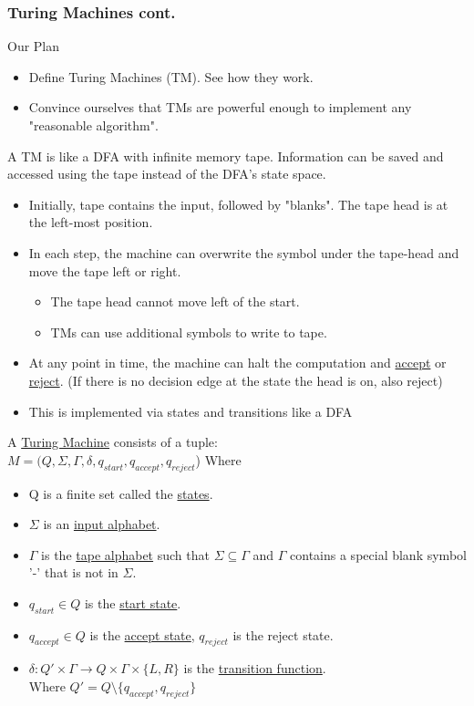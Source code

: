 \subsubsection*{Turing Machines cont.}
Our Plan
\begin{itemize}
  \item Define Turing Machines (TM). See how they work.
  \item Convince ourselves that TMs are powerful enough to implement any "reasonable algorithm".
    
\end{itemize}
A TM is like a DFA with infinite memory tape. Information can be saved and accessed using the tape instead of the DFA's state space.
\begin{itemize}
  \item Initially, tape contains the input, followed by "blanks". The tape head is at the left-most position.
  \item In each step, the machine can overwrite the symbol under the tape-head and move the tape left or right.
    \begin{itemize}
      \item The tape head cannot move left of the start.
      \item TMs can use additional symbols to write to tape.
    \end{itemize}
  \item At any point in time, the machine can halt the computation and \underline{accept} or \underline{reject}. (If there is no decision edge at the state the head is on, also reject)
  \item This is implemented via states and transitions like a DFA
\end{itemize}
\begin{definition} \label{TuringMachine}
  A \underline{Turing Machine} consists of a tuple: 
  \\$M = (Q, \Sigma, \Gamma, \delta, q_{start}, q_{accept}, q_{reject}$) Where
  \begin{itemize}
    \item Q is a finite set called the \underline{states}. 
    \item $\Sigma$ is an \underline{input alphabet}.
    \item $\Gamma$ is the \underline{tape alphabet} such that $\Sigma \subseteq \Gamma$ and $\Gamma$ contains a special blank symbol '-' that is not in $\Sigma$.
    \item $q_{start} \in Q$ is the \underline{start state}.
    \item $q_{accept} \in Q$ is the \underline{accept state}, $q_{reject}$ is the reject state.
    \item $\delta : Q' \times \Gamma \rightarrow Q \times \Gamma \times \{L, R\}$ is the \underline{transition function}.
    \\ \indent \indent Where $Q' = Q \setminus \{q_{accept}, q_{reject}\}$
  \end{itemize}
\end{definition}

